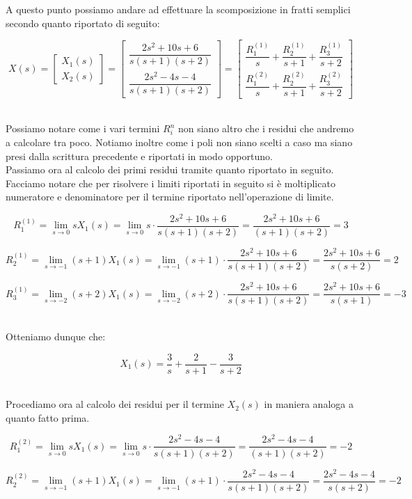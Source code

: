 \documentclass[../main.tex]{subfiles}
\begin{document}
A questo punto possiamo andare ad effettuare la scomposizione in fratti semplici secondo quanto riportato di seguito:

\[ X(s) = \begin{bmatrix} X_1(s) \\ X_2(s)\end{bmatrix} = \begin{bmatrix} \dfrac{2s^2 + 10s + 6}{s(s+1)(s+2)} \\[1em] \dfrac{2s^2-4s-4}{s(s+1)(s+2)}  \end{bmatrix} = \begin{bmatrix} \dfrac{R_1^{(1)}}{s} + \dfrac{R_2^{(1)}}{s+1} + \dfrac{R_3^{(1)}}{s+2} \\[1em] \dfrac{R_1^{(2)}}{s} + \dfrac{R_2^{(2)}}{s+1} + \dfrac{R_3^{(2)}}{s+2} \end{bmatrix} \]\

Possiamo notare come i vari termini $R_i^n$ non siano altro che i residui che andremo a calcolare tra poco. Notiamo inoltre come i poli non siano scelti a caso ma siano presi dalla scrittura precedente e riportati in modo opportuno.\\

Passiamo ora al calcolo dei primi residui tramite quanto riportato in seguito. Facciamo notare che per risolvere i limiti riportati in seguito si è moltiplicato numeratore e denominatore per il termine riportato nell'operazione di limite.

\[ R_1^{(1)} = \lim_{s \to 0} sX_1(s) = \lim_{s \to 0} s \cdot \frac{2s^2 + 10s + 6}{s(s+1)(s+2)} = \frac{2s^2 + 10s + 6}{(s+1)(s+2)} = 3 \]

\[ R_2^{(1)} = \lim_{s \to -1} (s+1)X_1(s) = \lim_{s \to -1} (s+1) \cdot \frac{2s^2 + 10s + 6}{s(s+1)(s+2)} = \frac{2s^2 + 10s + 6}{s(s+2)} = 2 \]

\[ R_3^{(1)} = \lim_{s \to -2} (s+2)X_1(s) = \lim_{s \to -2} (s+2) \cdot \frac{2s^2 + 10s + 6}{s(s+1)(s+2)} = \frac{2s^2 + 10s + 6}{s(s+1)} = -3 \]\

Otteniamo dunque che:

\[ X_1(s) = \frac{3}{s} + \frac{2}{s+1} - \frac{3}{s+2} \]\

Procediamo ora al calcolo dei residui per il termine $X_2(s)$ in maniera analoga a quanto fatto prima.


\[ R_1^{(2)} = \lim_{s \to 0} sX_1(s) = \lim_{s \to 0} s \cdot \frac{2s^2-4s-4}{s(s+1)(s+2)} = \frac{2s^2-4s-4}{(s+1)(s+2)} = -2 \]

\[ R_2^{(2)} = \lim_{s \to -1} (s+1)X_1(s) = \lim_{s \to -1} (s+1) \cdot \frac{2s^2-4s-4}{s(s+1)(s+2)} = \frac{2s^2-4s-4}{s(s+2)} = -2 \]
\end{document}
